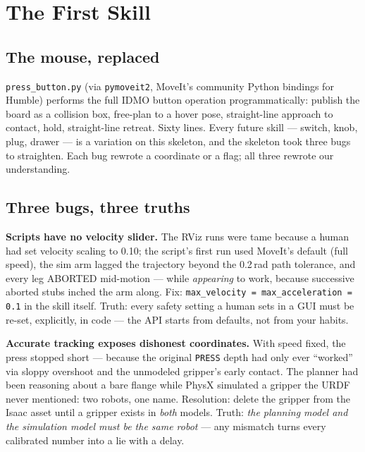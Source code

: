 \chapter{The First Skill}
\label{ch:skill}

\section{The mouse, replaced}

\texttt{press\_button.py} (via \texttt{pymoveit2}, MoveIt's community Python bindings for
Humble) performs the full IDMO button operation programmatically: publish the board as a
collision box, free-plan to a hover pose, straight-line approach to contact, hold, straight-line
retreat. Sixty lines. Every future skill --- switch, knob, plug, drawer --- is a variation on
this skeleton, and the skeleton took three bugs to straighten. Each bug rewrote a coordinate or
a flag; all three rewrote our understanding.

\section{Three bugs, three truths}

\begin{lesson}
\textbf{Scripts have no velocity slider.} The RViz runs were tame because a human had set
velocity scaling to 0.10; the script's first run used MoveIt's default (full speed), the sim
arm lagged the trajectory beyond the 0.2\,rad path tolerance, and every leg ABORTED mid-motion
--- while \emph{appearing} to work, because successive aborted stubs inched the arm along.
Fix: \texttt{max\_velocity = max\_acceleration = 0.1} in the skill itself. Truth: every safety
setting a human sets in a GUI must be re-set, explicitly, in code --- the API starts from
defaults, not from your habits.
\end{lesson}

\begin{lesson}
\textbf{Accurate tracking exposes dishonest coordinates.} With speed fixed, the press stopped
short --- because the original \texttt{PRESS} depth had only ever ``worked'' via sloppy
overshoot and the unmodeled gripper's early contact. The planner had been reasoning about a
bare flange while PhysX simulated a gripper the URDF never mentioned: two robots, one name.
Resolution: delete the gripper from the Isaac asset until a gripper exists in \emph{both}
models. Truth: \emph{the planning model and the simulation model must be the same robot} ---
any mismatch turns every calibrated number into a lie with a delay.
\end{lesson}

